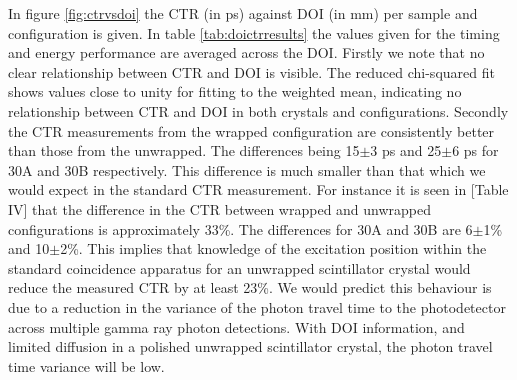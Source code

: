 In figure \ref{fig:ctrvsdoi} the CTR (in ps) against DOI (in mm) per sample and configuration is given. In table \ref{tab:doictrresults} the values given for the timing and energy performance are averaged across the DOI. Firstly we note that no clear relationship between CTR and DOI is visible. The reduced chi-squared fit shows values close to unity for fitting to the weighted mean, indicating no relationship between CTR and DOI in both crystals and configurations. Secondly the CTR measurements from the wrapped configuration are consistently better than those from the unwrapped. The differences being 15$\pm$3 ps and 25$\pm$6 ps for 30A and 30B respectively. This difference is much smaller than that which we would expect in the standard CTR measurement. For instance it is seen in [Table IV]\cite{r_Paganoni_Pauwels_et_al__2011} that the difference in the CTR between wrapped and unwrapped configurations is approximately 33\%. The differences for 30A and 30B are 6$\pm$1\% and 10$\pm$2\%. This implies that knowledge of the excitation position within the standard coincidence apparatus for an unwrapped scintillator crystal would reduce the measured CTR by at least 23\%. We would predict this behaviour is due to a reduction in the variance of the photon travel time  to the photodetector across multiple gamma ray photon detections. With DOI information, and limited diffusion in a polished unwrapped scintillator crystal, the photon travel time variance will be low.

